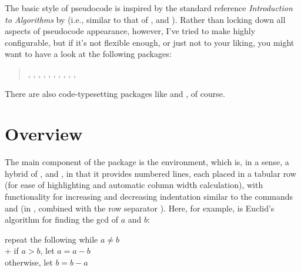 \documentclass[a4paper]{article}
\def\refc{\refCom*}
\def\refe{\refEnv*}
\begin{document}
The basic style of pseudocode is inspired by the standard reference
\emph{Introduction to Algorithms} by \citet{Cormen:2009} (i.e., similar to
that of ,
 and
).
%
Rather than locking down all aspects of pseudocode appearance, however, I've
tried to make  highly configurable, but if it's not flexible
enough, or just not to your liking, you might want to have a look at the
following packages:

\begin{quote}
    ,
    ,
    ,
    ,
    ,
    ,
    ,
    ,
    ,
    ,
\end{quote}

\noindent
There are also code-typesetting packages like
 and
, of course.

\section{Overview}

The main component of the  package is the \refe{pseudo}
environment, which is, in a sense, a hybrid of ,
 and , in that it provides numbered lines, each
placed in a tabular row (for ease of highlighting and automatic column width
calculation), with functionality for increasing and decreasing indentation
similar to the  commands \cs{+} and \cs{-} (in ,
combined with the row separator \refc{\bslash}). Here, for example, is
Euclid's algorithm for finding the gcd of $a$ and $b$:

\begin{texexp}
\begin{pseudo}
repeat the following while $a\neq b$            \\+
    if $a > b$, let $a = a - b$                 \\
    otherwise, let $b = b - a$
\end{pseudo}
\end{texexp}
\end{document}
